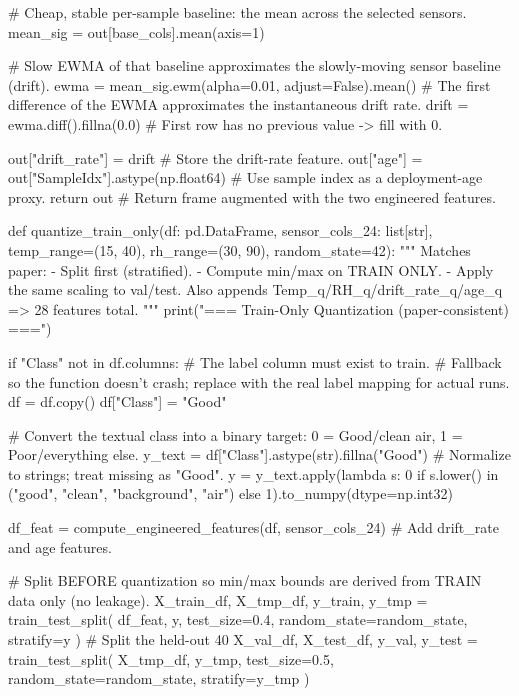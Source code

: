     # Cheap, stable per-sample baseline: the mean across the selected sensors.
    mean_sig = out[base_cols].mean(axis=1)

    # Slow EWMA of that baseline approximates the slowly-moving sensor baseline (drift).
    ewma = mean_sig.ewm(alpha=0.01, adjust=False).mean()
    # The first difference of the EWMA approximates the instantaneous drift rate.
    drift = ewma.diff().fillna(0.0)        # First row has no previous value -> fill with 0.

    out["drift_rate"] = drift              # Store the drift-rate feature.
    out["age"] = out["SampleIdx"].astype(np.float64)  # Use sample index as a deployment-age proxy.
    return out                             # Return frame augmented with the two engineered features.

def quantize_train_only(df: pd.DataFrame,
                        sensor_cols_24: list[str],
                        temp_range=(15, 40),
                        rh_range=(30, 90),
                        random_state=42):
    """
    Matches paper:
    - Split first (stratified).
    - Compute min/max on TRAIN ONLY.
    - Apply the same scaling to val/test.
    Also appends Temp_q/RH_q/drift_rate_q/age_q => 28 features total.
    """
    print("\n=== Train-Only Quantization (paper-consistent) ===")

    if "Class" not in df.columns:          # The label column must exist to train.
        # Fallback so the function doesn't crash; replace with the real label mapping for actual runs.
        df = df.copy()
        df["Class"] = "Good"

    # Convert the textual class into a binary target: 0 = Good/clean air, 1 = Poor/everything else.
    y_text = df["Class"].astype(str).fillna("Good")  # Normalize to strings; treat missing as "Good".
    y = y_text.apply(lambda s: 0 if s.lower() in ("good", "clean", "background", "air") else 1).to_numpy(dtype=np.int32)

    df_feat = compute_engineered_features(df, sensor_cols_24)  # Add drift_rate and age features.

    # Split BEFORE quantization so min/max bounds are derived from TRAIN data only (no leakage).
    X_train_df, X_tmp_df, y_train, y_tmp = train_test_split(
        df_feat, y, test_size=0.4, random_state=random_state, stratify=y
    )
    # Split the held-out 40%
    X_val_df, X_test_df, y_val, y_test = train_test_split(
        X_tmp_df, y_tmp, test_size=0.5, random_state=random_state, stratify=y_tmp
    )

